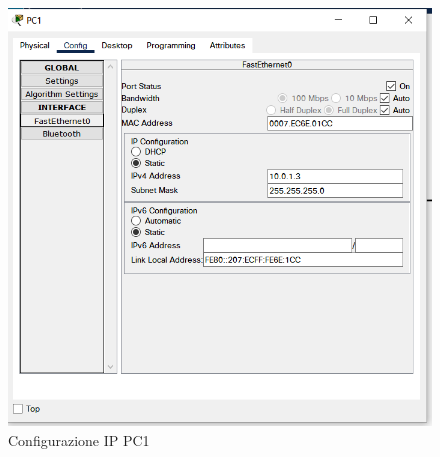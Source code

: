 \documentclass[a4paper,12pt]{report}
\begin{document}
\begin{figure}[H]
\includegraphics[]{pc1_ip_config.png}
\caption{Configurazione IP PC1}
\label{fig:pc1_ip_config}
\end{figure}
\end{document}
